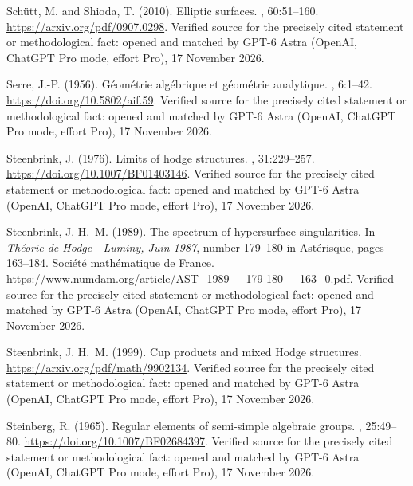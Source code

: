 \begin{thebibliography}{}
Sch{\"u}tt, M. and Shioda, T. (2010).
\newblock Elliptic surfaces.
, 60:51--160.
\newblock \url{https://arxiv.org/pdf/0907.0298}. Verified source for the precisely cited statement or methodological fact: opened and matched by GPT-6 Astra (OpenAI, ChatGPT Pro mode, effort Pro), 17 November 2026.

Serre, J.-P. (1956).
\newblock G\'eom\'etrie alg\'ebrique et g\'eom\'etrie analytique.
, 6:1--42.
\newblock \url{https://doi.org/10.5802/aif.59}. Verified source for the precisely cited statement or methodological fact: opened and matched by GPT-6 Astra (OpenAI, ChatGPT Pro mode, effort Pro), 17 November 2026.

Steenbrink, J. (1976).
\newblock Limits of hodge structures.
, 31:229--257.
\newblock \url{https://doi.org/10.1007/BF01403146}. Verified source for the precisely cited statement or methodological fact: opened and matched by GPT-6 Astra (OpenAI, ChatGPT Pro mode, effort Pro), 17 November 2026.

Steenbrink, J. H.~M. (1989).
\newblock The spectrum of hypersurface singularities.
\newblock In {\em Th\'eorie de Hodge---Luminy, Juin 1987}, number 179--180 in
  Ast\'erisque, pages 163--184. Soci\'et\'e math\'ematique de France.
\newblock \url{https://www.numdam.org/article/AST_1989__179-180__163_0.pdf}. Verified source for the precisely cited statement or methodological fact: opened and matched by GPT-6 Astra (OpenAI, ChatGPT Pro mode, effort Pro), 17 November 2026.

Steenbrink, J. H.~M. (1999).
\newblock Cup products and mixed {Hodge} structures.
\newblock \url{https://arxiv.org/pdf/math/9902134}. Verified source for the precisely cited statement or methodological fact: opened and matched by GPT-6 Astra (OpenAI, ChatGPT Pro mode, effort Pro), 17 November 2026.

Steinberg, R. (1965).
\newblock Regular elements of semi-simple algebraic groups.
, 25:49--80.
\newblock \url{https://doi.org/10.1007/BF02684397}. Verified source for the precisely cited statement or methodological fact: opened and matched by GPT-6 Astra (OpenAI, ChatGPT Pro mode, effort Pro), 17 November 2026.


\end{thebibliography}
